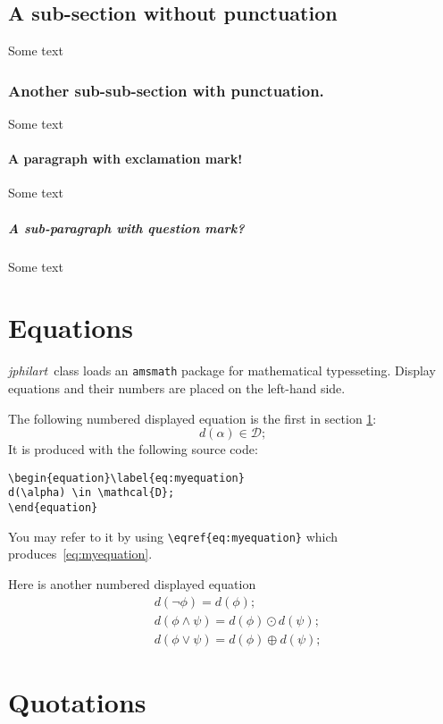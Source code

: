 \documentclass{jphilart}
\newcommand{\jphilart}{\emph{jphilart}\ } %
\begin{document}
\subsection{A sub-section without punctuation} Some text

\subsubsection{Another sub-sub-section with punctuation.} Some text

\paragraph{A paragraph with exclamation mark!} Some text

\subparagraph{A sub-paragraph with question mark?} Some text

\section{Equations}\label{se:mysection}

\jphilart class loads an \texttt{amsmath} package for mathematical typesseting.
Display equations and their numbers are placed on the left-hand side.

The following numbered displayed equation is the first in section \ref{se:mysection}:%
\begin{equation}\label{eq:myequation}
d(\alpha) \in \mathcal{D};
\end{equation}
It is produced with the following source code:
\begin{verbatim}
\begin{equation}\label{eq:myequation}
d(\alpha) \in \mathcal{D};
\end{equation}\end{verbatim}
You may refer to it by using \verb+\eqref{eq:myequation}+ which
produces~\eqref{eq:myequation}.

Here is another numbered displayed equation
\begin{equation}
\begin{split}
&d(\neg\phi) = d(\phi);\\
&d(\phi\wedge\psi) = d(\phi)\odot d(\psi);\\
&d(\phi\vee\psi) = d(\phi)\oplus d(\psi);
\end{split}
\end{equation}

\section{Quotations}
\end{document}
